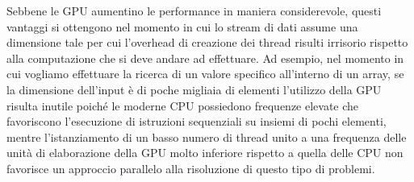 Sebbene le GPU aumentino le performance in maniera considerevole, questi
vantaggi si ottengono nel momento in cui lo stream di dati assume
una dimensione tale per cui l'overhead di creazione dei thread risulti
irrisorio rispetto alla computazione che si deve andare ad effettuare.
Ad esempio, nel momento in cui vogliamo effettuare la ricerca di un valore
specifico all'interno di un array, se la dimensione dell'input è di poche
migliaia di elementi l'utilizzo della GPU risulta inutile poiché
le moderne CPU possiedono frequenze elevate che favoriscono l'esecuzione
di istruzioni sequenziali su insiemi di pochi elementi, mentre l'istanziamento
di un basso numero di thread unito a una frequenza delle unità di elaborazione
della GPU molto inferiore rispetto a quella delle CPU non favorisce un
approccio parallelo alla risoluzione di questo tipo di problemi.
